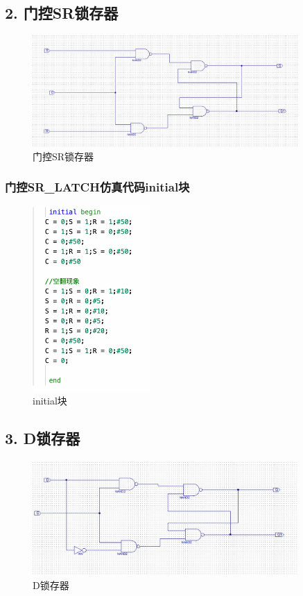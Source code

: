 \documentclass{article}
\begin{document}
\subsection*{2. 门控SR锁存器}
    \begin{figure}[H]
    \centering
    \includegraphics[width=0.9\textwidth]{lab9p/6.png}
    \caption{\label{Lab9}门控SR锁存器}
    \end{figure}

\subsubsection*{门控SR\_LATCH仿真代码initial块}
    \begin{figure}[H]
    \centering
    \includegraphics[width=0.4\textwidth]{lab9p/12.png}
    \caption{\label{Lab9}initial块}
    \end{figure}

\subsection*{3. D锁存器}
    \begin{figure}[H]
    \centering
    \includegraphics[width=0.9\textwidth]{lab9p/7.png}
    \caption{\label{Lab9}D锁存器}
    \end{figure}
\end{document}
